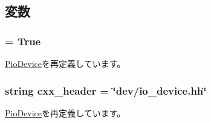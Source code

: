 \subsection{変数}
\hypertarget{classDevice_1_1BasicPioDevice_a17fa61ac3806b481cafee5593b55e5d0}{
\subsubsection[{abstract}]{ = True}}
\label{classDevice_1_1BasicPioDevice_a17fa61ac3806b481cafee5593b55e5d0}


\hyperlink{classDevice_1_1PioDevice_a17fa61ac3806b481cafee5593b55e5d0}{PioDevice}を再定義しています。\hypertarget{classDevice_1_1BasicPioDevice_a17da7064bc5c518791f0c891eff05fda}{
\subsubsection[{cxx\_\-header}]{\setlength{\rightskip}{0pt plus 5cm}string {\bf cxx\_\-header} = \char`\"{}dev/io\_\-device.hh\char`\"{}}}
\label{classDevice_1_1BasicPioDevice_a17da7064bc5c518791f0c891eff05fda}


\hyperlink{classDevice_1_1PioDevice_a17da7064bc5c518791f0c891eff05fda}{PioDevice}を再定義しています。

